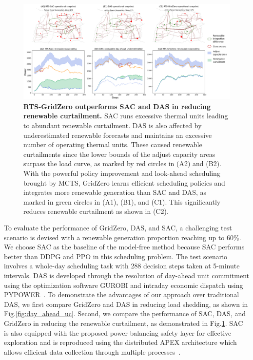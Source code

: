 \begin{figure}[h]
  \centering
  \includegraphics[width=1.0\linewidth]{fig/sac_das_gridzero.png}
  \caption{\textbf{RTS-GridZero outperforms SAC and DAS in reducing renewable curtailment.}
  SAC runs excessive thermal units leading to abundant renewable curtailment. DAS is also affected by underestimated renewable forecasts and maintains an excessive number of operating thermal units. These caused renewable curtailments since the lower bounds of the adjust capacity areas surpass the load curve, as marked by red circles in (A2) and (B2). With the powerful policy improvement and look-ahead scheduling brought by MCTS, GridZero learns efficient scheduling policies and integrates more renewable generation than SAC and DAS, as marked in green circles in (A1), (B1), and (C1). This significantly reduces renewable curtailment as shown in (C2). 
  } 
  \label{fig:renewable_curtailment}
\end{figure}
 

To evaluate the performance of GridZero, DAS, and SAC, a challenging test scenario is devised with a renewable generation proportion reaching up to 60\%. We choose SAC as the baseline of the model-free method because SAC performs better than DDPG and PPO in this scheduling problem.
The test scenario involves a whole-day scheduling task with 288 decision steps taken at 5-minute intervals. 
DAS is developed through the resolution of day-ahead unit commitment using the optimization software GUROBI and intraday economic dispatch using PYPOWER~\cite{lincoln2019pypower}. 
To demonstrate the advantages of our approach over traditional DAS, we first compare GridZero and DAS in reducing load shedding, as shown in Fig.\ref{fig:day_ahead_uc}. Second, we compare the performance of SAC, DAS, and GridZero in reducing the renewable curtailment, as demonstrated in Fig.\ref{fig:renewable_curtailment}.
SAC is also equipped with the proposed power balancing safety layer for effective exploration and is reproduced using the distributed APEX architecture which allows efficient data collection through multiple processes~\cite{horgan2018distributed}.


